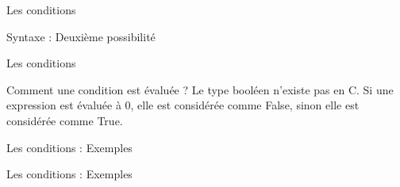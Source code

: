 	\begin{frame}{Les conditions}
		  		\begin{block}{Syntaxe : Deuxième possibilité}
			\ifelsemulti
		\end{block}
	\end{frame}




	\begin{frame}{Les conditions}
		\begin{block}{Comment une condition est évaluée  ?}
			Le type \alert{booléen } n'existe pas en C. Si une expression est évaluée à 0, elle est considérée comme \alert{False}, sinon elle est considérée comme \alert{True}.
		\end{block}
	\end{frame}

	\begin{frame}{Les conditions : Exemples}	
		\begin{center}
			\begin{minipage}[t]{0.48\linewidth}
				\ifexampleone
			\end{minipage}
			\qquad
			\begin{minipage}[t]{0.48\linewidth}
				\ifexampletwo
			\end{minipage}
			\begin{minipage}[t]{0.48\linewidth}
				\ifexamplethree
			\end{minipage}
		\end{center}
	\end{frame}

	\begin{frame}{Les conditions : Exemples}	
		\ifexampleone
		\ifexampletwo
		\ifexamplethree
	\end{frame}
	
